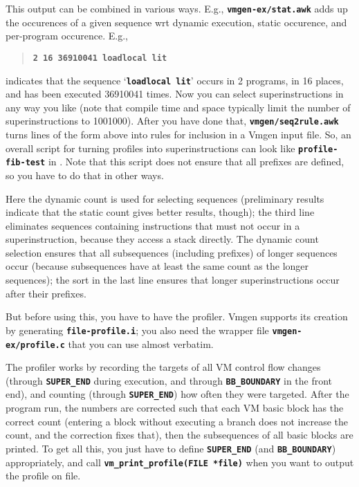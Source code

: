 \documentclass[10pt,english]{article}
\begin{document}
This output can be combined in various ways. E.g., \texttt{\textbf{vmgen-ex/stat.awk}}
adds up the occurences of a given sequence wrt dynamic execution,
static occurence, and per-program occurence. E.g.,
\begin{quotation}
\texttt{\textbf{2 16 36910041 loadlocal lit}}
\end{quotation}
indicates that the sequence \textquoteleft{}\texttt{\textbf{loadlocal
lit}}\textquoteright{} occurs in 2 programs, in 16 places, and has
been executed 36910041 times. Now you can select superinstructions
in any way you like (note that compile time and space typically limit
the number of superinstructions to 100\textendash{}1000). After you
have done that, \texttt{\textbf{vmgen/seq2rule.awk}} turns lines of
the form above into rules for inclusion in a Vmgen input file. So,
an overall script for turning profiles into superinstructions can
look like \texttt{\textbf{profile-fib-test}} in .
Note that this script does not ensure that all prefixes are defined,
so you have to do that in other ways.

Here the dynamic count is used for selecting sequences (preliminary
results indicate that the static count gives better results, though);
the third line eliminates sequences containing instructions that must
not occur in a superinstruction, because they access a stack directly.
The dynamic count selection ensures that all subsequences (including
prefixes) of longer sequences occur (because subsequences have at
least the same count as the longer sequences); the sort in the last
line ensures that longer superinstructions occur after their prefixes.

But before using this, you have to have the profiler. Vmgen supports
its creation by generating \texttt{\textbf{file-profile.i}}; you also
need the wrapper file \texttt{\textbf{vmgen-ex/profile.c}} that you
can use almost verbatim.

The profiler works by recording the targets of all VM control flow
changes (through \texttt{\textbf{SUPER\_END}} during execution, and
through \texttt{\textbf{BB\_BOUNDARY}} in the front end), and counting
(through \texttt{\textbf{SUPER\_END}}) how often they were targeted.
After the program run, the numbers are corrected such that each VM
basic block has the correct count (entering a block without executing
a branch does not increase the count, and the correction fixes that),
then the subsequences of all basic blocks are printed. To get all
this, you just have to define \texttt{\textbf{SUPER\_END}} (and \texttt{\textbf{BB\_BOUNDARY}})
appropriately, and call \texttt{\textbf{vm\_print\_profile(FILE {*}file)}}
when you want to output the profile on file.
\end{document}
